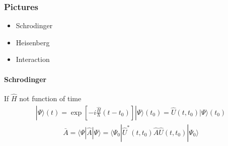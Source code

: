 \documentclass[letterpaper,10pt,english]{jupyterBook}
\begin{document}
\subsubsection{Pictures}
\label{\detokenize{ch/quantum-mechanics/intro:pictures}}\label{\detokenize{ch/quantum-mechanics/intro:quantum-mechanics-intro-non-relativistic-schrodinger-equation-pictures}}\begin{itemize}
\item {} 
\sphinxAtStartPar
Schrodinger

\item {} 
\sphinxAtStartPar
Heisenberg

\item {} 
\sphinxAtStartPar
Interaction

\end{itemize}


\paragraph{Schrodinger}
\label{\detokenize{ch/quantum-mechanics/intro:schrodinger}}\label{\detokenize{ch/quantum-mechanics/intro:quantum-mechanics-intro-non-relativistic-schrodinger-equation-pictures-schrodinger}}
\sphinxAtStartPar
If \(\hat{H}\) not function of time
\begin{equation*}
\begin{split}| \Psi \rangle (t) = \exp\left[ - i \frac{\hat{H}}{\hbar} (t-t_0) \right] | \Psi \rangle(t_0) = \hat{U}(t,t_0) | \Psi \rangle(t_0) \end{split}
\end{equation*}\begin{equation*}
\begin{split}\bar{A} = \langle \Psi | \hat{A} | \Psi \rangle = \langle \Psi_0 | \hat{U}^*(t,t_0) \hat{A} \hat{U}(t,t_0) | \Psi_0 \rangle\end{split}
\end{equation*}
\end{document}
